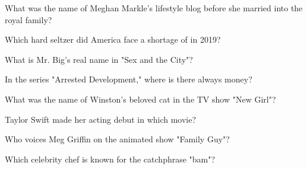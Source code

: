 \documentclass[12pt,a4paper]{book}
\begin{document}
\begin{enhancedmcq}[Question 11]{What was the name of Meghan Markle's lifestyle blog before she married into the royal family?}
\end{enhancedmcq}

\begin{enhancedmcq}[Question 12]{Which hard seltzer did America face a shortage of in 2019?}
\end{enhancedmcq}

\begin{enhancedmcq}[Question 13]{What is Mr. Big's real name in "Sex and the City"?}
\end{enhancedmcq}

\begin{enhancedmcq}[Question 14]{In the series "Arrested Development," where is there always money?}
\end{enhancedmcq}

\begin{enhancedmcq}[Question 15]{What was the name of Winston's beloved cat in the TV show "New Girl"?}
\end{enhancedmcq}

\begin{enhancedmcq}[Question 16]{Taylor Swift made her acting debut in which movie?}
\end{enhancedmcq}

\begin{enhancedmcq}[Question 17]{Who voices Meg Griffin on the animated show "Family Guy"?}
\end{enhancedmcq}

\begin{enhancedmcq}[Question 18]{Which celebrity chef is known for the catchphrase "bam"?}
\end{enhancedmcq}
\end{document}
